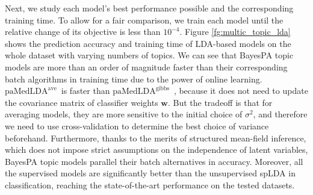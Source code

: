 \documentclass[twoside,11pt]{article}
\newcommand{\wv}{\bm{w}}
\newcommand\paMedLDAave{$\text{paMedLDA}^{\text{ave}}$~}
\newcommand\paMedLDAgibbs{$\text{paMedLDA}^{\text{gibbs}}$~}
\begin{document}
Next, we study each model's best performance possible and the corresponding training time.
To allow for a fair comparison, we train each model until the relative change of  its objective is less than $10^{-4}$.
 Figure \ref{fg:multic_topic_lda} shows the prediction accuracy and training time of LDA-based models on the whole dataset with varying numbers of topics. We can see that BayesPA topic models are more than an order of magnitude faster than their corresponding batch algorithms in training time due to the power of online learning. \paMedLDAave is faster than \paMedLDAgibbs, because it does not need to update the covariance matrix of classifier weights $\wv$. But the tradeoff is that for averaging models, they are more sensitive to the initial choice of $\sigma^2$, and therefore we need to use cross-validation to determine the best choice of variance beforehand.
Furthermore, thanks to the merits of structured mean-field inference, which does not impose strict assumptions on the independence of latent variables, BayesPA topic models parallel their batch alternatives in accuracy. Moreover, all the supervised models are significantly better than the unsupervised spLDA in classification, reaching the state-of-the-art performance on the tested datasets.
\end{document}
